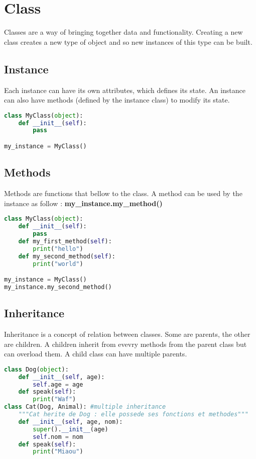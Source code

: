 \documentclass[a4paper, 12pt]{article}
\begin{document}
\newpage
\section{Class}
\label{sec:Class}
Classes are a way of bringing together data and functionality. Creating a new class creates a new type of object and so new instances of this type can be built.\newline

\subsection{Instance}
Each instance can have its own attributes, which defines its state. An instance can also have methods (defined by the instance class) to modify its state.
\begin{lstlisting}[language=Python]
class MyClass(object):
	def __init__(self):
		pass

my_instance = MyClass()
\end{lstlisting}

\subsection{Methods}
Methods are functions that bellow to the class. A method can be used by the instance as follow  : \textbf{my\_instance.my\_method()}
\begin{lstlisting}[language=Python]
class MyClass(object):
	def __init__(self):
		pass
	def my_first_method(self):
	    print("hello")
	def my_second_method(self):
	    print("world")

my_instance = MyClass()
my_instance.my_second_method()
\end{lstlisting}

\subsection{Inheritance}
Inheritance is a concept of relation between classes. Some are parents, the other are children. A children inherit from evevry methods from the parent class but can overload them. A child class can have multiple parents.
\begin{lstlisting}[language=Python]
class Dog(object):
	def __init__(self, age):
		self.age = age
	def speak(self):
		print("Waf")
class Cat(Dog, Animal): #multiple inheritance
	"""Cat herite de Dog : elle possede ses fonctions et methodes"""
	def __init__(self, age, nom):
		super().__init__(age)
		self.nom = nom
	def speak(self):
		print("Miaou")
\end{lstlisting}
\end{document}
